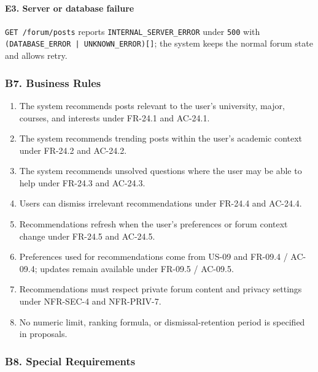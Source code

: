 \documentclass[12pt]{article}
\begin{document}
\hypertarget{sec:e3-server-or-database-failure}{}
\paragraph*{E3. Server or database failure}
\par\medskip

\texttt{GET /forum/posts} reports \texttt{INTERNAL\_SERVER\_ERROR} under \texttt{500} with \texttt{(DATABASE\_ERROR | UNKNOWN\_ERROR)[]}; the system keeps the normal forum state and allows retry.
\par\medskip

\hypertarget{sec:b7-business-rules}{}
\subsubsection*{B7. Business Rules}
\par\medskip

\begin{enumerate}
\item The system recommends posts relevant to the user's university, major, courses, and interests under FR-24.1 and AC-24.1.
\item The system recommends trending posts within the user's academic context under FR-24.2 and AC-24.2.
\item The system recommends unsolved questions where the user may be able to help under FR-24.3 and AC-24.3.
\item Users can dismiss irrelevant recommendations under FR-24.4 and AC-24.4.
\item Recommendations refresh when the user's preferences or forum context change under FR-24.5 and AC-24.5.
\item Preferences used for recommendations come from US-09 and FR-09.4 / AC-09.4; updates remain available under FR-09.5 / AC-09.5.
\item Recommendations must respect private forum content and privacy settings under NFR-SEC-4 and NFR-PRIV-7.
\item No numeric limit, ranking formula, or dismissal-retention period is specified in proposals.
\end{enumerate}
\par\medskip

\hypertarget{sec:b8-special-requirements}{}
\subsubsection*{B8. Special Requirements}
\par\medskip
\end{document}
